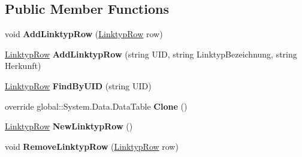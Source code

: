 \subsection*{Public Member Functions}
\begin{DoxyCompactItemize}
\item 
void {\bfseries Add\+Linktyp\+Row} (\hyperlink{class_products_1_1_data_1_1ds_sage_1_1_linktyp_row}{Linktyp\+Row} row)\hypertarget{class_products_1_1_data_1_1ds_sage_1_1_linktyp_data_table_a17236546784e21f40bd97412030f3cf9}{}\label{class_products_1_1_data_1_1ds_sage_1_1_linktyp_data_table_a17236546784e21f40bd97412030f3cf9}

\item 
\hyperlink{class_products_1_1_data_1_1ds_sage_1_1_linktyp_row}{Linktyp\+Row} {\bfseries Add\+Linktyp\+Row} (string U\+ID, string Linktyp\+Bezeichnung, string Herkunft)\hypertarget{class_products_1_1_data_1_1ds_sage_1_1_linktyp_data_table_ae3424ad91fa3a893dc038f1105da24f7}{}\label{class_products_1_1_data_1_1ds_sage_1_1_linktyp_data_table_ae3424ad91fa3a893dc038f1105da24f7}

\item 
\hyperlink{class_products_1_1_data_1_1ds_sage_1_1_linktyp_row}{Linktyp\+Row} {\bfseries Find\+By\+U\+ID} (string U\+ID)\hypertarget{class_products_1_1_data_1_1ds_sage_1_1_linktyp_data_table_a244fb305c3e4bfa76148ecf1f1ea368a}{}\label{class_products_1_1_data_1_1ds_sage_1_1_linktyp_data_table_a244fb305c3e4bfa76148ecf1f1ea368a}

\item 
override global\+::\+System.\+Data.\+Data\+Table {\bfseries Clone} ()\hypertarget{class_products_1_1_data_1_1ds_sage_1_1_linktyp_data_table_aad9848b56ca6f8f9f967cb269f73e867}{}\label{class_products_1_1_data_1_1ds_sage_1_1_linktyp_data_table_aad9848b56ca6f8f9f967cb269f73e867}

\item 
\hyperlink{class_products_1_1_data_1_1ds_sage_1_1_linktyp_row}{Linktyp\+Row} {\bfseries New\+Linktyp\+Row} ()\hypertarget{class_products_1_1_data_1_1ds_sage_1_1_linktyp_data_table_a0eac074ed05815b09693877bd440758a}{}\label{class_products_1_1_data_1_1ds_sage_1_1_linktyp_data_table_a0eac074ed05815b09693877bd440758a}

\item 
void {\bfseries Remove\+Linktyp\+Row} (\hyperlink{class_products_1_1_data_1_1ds_sage_1_1_linktyp_row}{Linktyp\+Row} row)\hypertarget{class_products_1_1_data_1_1ds_sage_1_1_linktyp_data_table_afab1edfb024b4394ad6fe35cfcac6bb0}{}\label{class_products_1_1_data_1_1ds_sage_1_1_linktyp_data_table_afab1edfb024b4394ad6fe35cfcac6bb0}

\end{DoxyCompactItemize}
